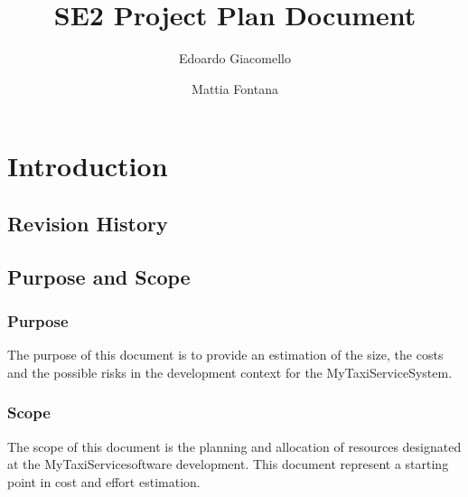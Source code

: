 \documentclass[11pt, a4paper,titlepage]{article}
\author{Edoardo Giacomello \and Mattia Fontana}
\title{SE2 Project Plan Document}
\newcommand{\productname}{MyTaxiService}
\begin{document}
	\maketitle
	\tableofcontents
	\newpage
	\section{Introduction}
	\subsection{Revision History}
	
	\subsection{Purpose and Scope}
	
	\subsubsection{Purpose}
	The purpose of this document is to provide an estimation of the size, the costs and the possible risks in the development context for the \productname System. \newline
	\subsubsection{Scope}
	The scope of this document is the planning and allocation of resources designated at the \productname software development. This document represent a starting point in cost and effort estimation.  
\end{document}
